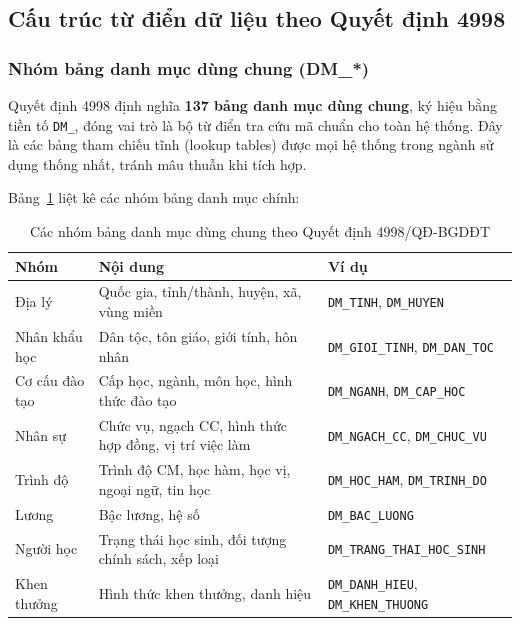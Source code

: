 \subsection{Cấu trúc từ điển dữ liệu theo Quyết định 4998}

\subsubsection{Nhóm bảng danh mục dùng chung (DM\_*)}

Quyết định 4998 định nghĩa \textbf{137 bảng danh mục dùng chung}, ký hiệu bằng tiền tố \texttt{DM\_}, đóng vai trò là bộ từ điển tra cứu mã chuẩn cho toàn hệ thống. Đây là các bảng tham chiếu tĩnh (lookup tables) được mọi hệ thống trong ngành sử dụng thống nhất, tránh mâu thuẫn khi tích hợp.

Bảng~\ref{tab:dm-groups} liệt kê các nhóm bảng danh mục chính:

\begin{table}[H]
\centering
\renewcommand{\arraystretch}{1.4}
\begin{tabularx}{\textwidth}{|l|X|l|}
\hline
\textbf{Nhóm} & \textbf{Nội dung} & \textbf{Ví dụ} \\
\hline
Địa lý & Quốc gia, tỉnh/thành, huyện, xã, vùng miền & \texttt{DM\_TINH}, \texttt{DM\_HUYEN} \\
\hline
Nhân khẩu học & Dân tộc, tôn giáo, giới tính, hôn nhân & \texttt{DM\_GIOI\_TINH}, \texttt{DM\_DAN\_TOC} \\
\hline
Cơ cấu đào tạo & Cấp học, ngành, môn học, hình thức đào tạo & \texttt{DM\_NGANH}, \texttt{DM\_CAP\_HOC} \\
\hline
Nhân sự & Chức vụ, ngạch CC, hình thức hợp đồng, vị trí việc làm & \texttt{DM\_NGACH\_CC}, \texttt{DM\_CHUC\_VU} \\
\hline
Trình độ & Trình độ CM, học hàm, học vị, ngoại ngữ, tin học & \texttt{DM\_HOC\_HAM}, \texttt{DM\_TRINH\_DO} \\
\hline
Lương & Bậc lương, hệ số & \texttt{DM\_BAC\_LUONG} \\
\hline
Người học & Trạng thái học sinh, đối tượng chính sách, xếp loại & \texttt{DM\_TRANG\_THAI\_HOC\_SINH} \\
\hline
Khen thưởng & Hình thức khen thưởng, danh hiệu & \texttt{DM\_DANH\_HIEU}, \texttt{DM\_KHEN\_THUONG} \\
\hline
\end{tabularx}
\caption{Các nhóm bảng danh mục dùng chung theo Quyết định 4998/QĐ-BGDĐT}
\label{tab:dm-groups}
\end{table}

